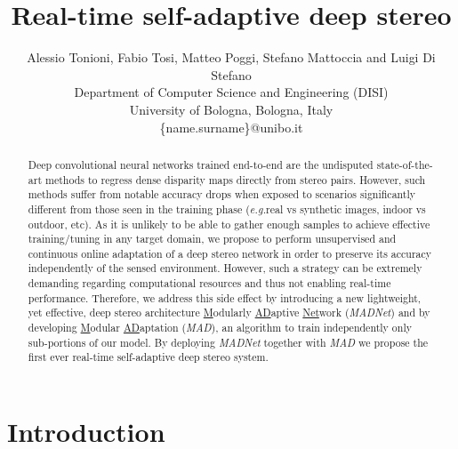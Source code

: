 \documentclass[10pt,twocolumn,letterpaper]{article}
\def\eg{\emph{e.g.}}
\def\netname{\emph{MADNet}}
\def\extendednetname{\underline{M}odularly \underline{AD}aptive \underline{Net}work}
\def\algoname{\emph{MAD}}
\def\extendedalgoname{\underline{M}odular \underline{AD}aptation}
\begin{document}
\title{Real-time self-adaptive deep stereo}

\author{Alessio Tonioni,  Fabio Tosi, Matteo Poggi, Stefano Mattoccia and Luigi Di Stefano \\
Department   of   Computer   Science   and   Engineering   (DISI)\\  University  of  Bologna,  Bologna,  Italy \\ \{name.surname\}@unibo.it \\
}


\maketitle
\ifwacvfinal\thispagestyle{empty}\fi

\begin{abstract}

Deep convolutional neural networks trained end-to-end are the undisputed state-of-the-art methods to regress dense disparity maps directly from stereo pairs. However, such methods suffer from notable accuracy drops when exposed to scenarios significantly different from those seen in the training phase (\eg real vs synthetic images, indoor vs outdoor, etc). As it is unlikely to be able to gather enough samples to achieve effective training/tuning in any target domain, we propose to perform unsupervised and continuous online adaptation of a deep stereo network in order to preserve its accuracy independently of the sensed environment. However, such a strategy can be extremely demanding regarding computational resources and thus not enabling real-time performance. Therefore, we address this side effect by introducing a new lightweight, yet effective, deep stereo architecture \extendednetname{} (\netname{}) and by developing \extendedalgoname{} (\algoname{}), an algorithm to train independently only sub-portions of our model. By deploying \netname{} together with \algoname{} we propose the first ever real-time self-adaptive deep stereo system. 

\end{abstract}

\section{Introduction}
\label{sec:intro}
\end{document}
